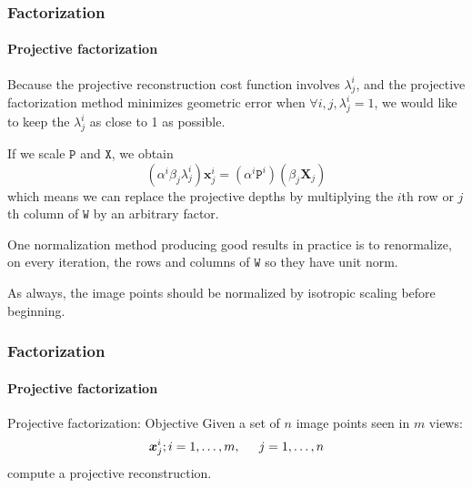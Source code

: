 \documentclass[aspectratio=169]{beamer}
\renewcommand{\vec}[1]{\boldsymbol{#1}}
\newcommand{\mat}[1]{\mathtt{#1}}
\begin{document}
\begin{frame}
\frametitle{Factorization}
\framesubtitle{Projective factorization}

Because the projective reconstruction cost function involves
$\lambda_j^i$, and the projective factorization method minimizes
geometric error when $\forall i,j, \lambda_j^i=1$, we would like to
keep the $\lambda_j^i$ \alert{as close to 1 as possible}.

\medskip

If we scale $\mat{P}$ and $\mat{X}$, we obtain
\begin{equation*}
(\alpha^i\beta_j\lambda_j^i)\vec{x}^i_j =
(\alpha^i\mat{P}^i)(\beta_j\vec{X}_j)
\end{equation*}
which means we can replace the projective depths by multiplying the
\alert{$i$th row} or \alert{$j$th column} of $\mat{W}$ by an
\alert{arbitrary factor}.

\medskip

One normalization method producing good results in practice is to
renormalize, on every iteration, the rows and columns of $\mat{W}$ so
they have \alert{unit norm}.

\medskip

As always, the \alert{image points} should be normalized by \alert{isotropic
scaling} before beginning.

\end{frame}

\begin{frame}
\frametitle{Factorization}
\framesubtitle{Projective factorization}

\begin{block}{Projective factorization: Objective}
Given a set of $n$ image points seen in $m$ views:
\begin{equation*}
\vec{x}_j^i ; i = 1, \ldots, m, \hspace{0.2in} j=1,\ldots,n
\end{equation*}
compute a projective reconstruction.
\end{block}

\end{frame}
\end{document}
